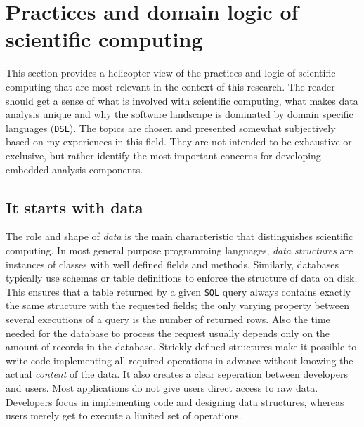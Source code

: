 \documentclass{article}
\newcommand{\SQL}{\texttt{SQL}\xspace}
\begin{document}

\section{Practices and domain logic of scientific computing}


This section provides a helicopter view of the practices and logic of scientific computing that are most relevant in the context of this research. The reader should get a sense of what is involved with scientific computing, what makes data analysis unique and why the software landscape is dominated by domain specific languages (\texttt{DSL}). The topics are chosen and presented somewhat subjectively based on my experiences in this field. They are not intended to be exhaustive or exclusive, but rather identify the most important concerns for developing embedded analysis components. 

\subsection{It starts with data}

The role and shape of \emph{data} is the main characteristic that distinguishes scientific computing. In most general purpose programming languages, \emph{data structures} are instances of classes with well defined fields and methods. Similarly, databases typically use schemas or table definitions to enforce the structure of data on disk. This ensures that a table returned by a given \SQL query always contains exactly the same structure with the requested fields; the only varying property between several executions of a query is the number of returned rows. Also the time needed for the database to process the request usually depends only on the amount of records in the database.
Strickly defined structures make it possible to write code implementing all required operations in advance without knowing the actual \emph{content} of the data. It also creates a clear seperation between developers and users. Most applications do not give users direct access to raw data. Developers focus in implementing code and designing data structures, whereas users merely get to execute a limited set of operations.
\end{document}
